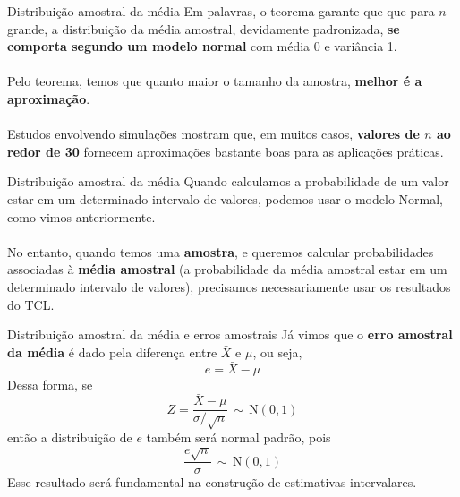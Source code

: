 \documentclass[10pt]{beamer}\usepackage[]{graphicx}\usepackage[]{color}
\providecommand{\N}{\text{N}}
\theoremstyle{definition}
\begin{document}

\begin{frame}{Distribuição amostral da média}
  Em palavras, o teorema garante que que para $n$ grande, a distribuição
  da média amostral, devidamente padronizada, \textbf{se comporta segundo um
  modelo normal} com média 0 e variância 1. \\~\\
  Pelo teorema, temos que quanto maior o tamanho da amostra, \textbf{melhor é a
  aproximação}. \\~\\
  Estudos envolvendo simulações mostram que, em muitos casos, \textbf{valores de
  $n$ ao redor de 30} fornecem aproximações bastante boas para as
  aplicações práticas.
\end{frame}

\begin{frame}{Distribuição amostral da média}
  Quando calculamos a probabilidade de um valor estar em um determinado
  intervalo de valores, podemos usar o modelo Normal, como vimos
  anteriormente. \\~\\
  No entanto, quando temos uma \textbf{amostra}, e queremos calcular
  probabilidades associadas à \textbf{média amostral} (a probabilidade
  da média amostral estar em um determinado intervalo de valores),
  precisamos necessariamente usar os resultados do TCL.
\end{frame}

\begin{frame}{Distribuição amostral da média e erros amostrais}
  Já vimos que o \textbf{erro amostral da média} é dado pela diferença
  entre $\bar{X}$ e $\mu$, ou seja,
  \begin{equation*}
    e = \bar{X} - \mu
  \end{equation*}
  Dessa forma, se
  \begin{equation*}
    Z = \frac{\bar{X} - \mu}{\sigma/\sqrt{n}} \, \sim \, \N(0,1)
  \end{equation*}
  então a distribuição de $e$ também será normal padrão, pois
  \begin{equation*}
    \frac{e \sqrt{n}}{\sigma} \, \sim \, \N(0,1)
  \end{equation*}
  Esse resultado será fundamental na construção de estimativas
  intervalares.
\end{frame}
\end{document}
